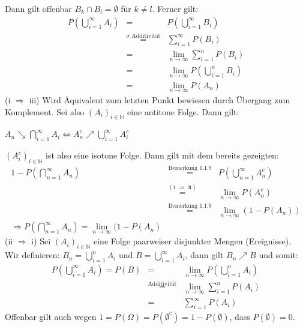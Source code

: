 \documentclass[10pt,a4paper]{report}
\numberwithin{equation}{section}
\numberwithin{figure}{section}
\theoremstyle{plain}
\theoremstyle{definition}
\theoremstyle{plain}
\theoremstyle{definition}
\theoremstyle{remark}
\theoremstyle{plain}
\begin{document}
Dann gilt offenbar $B_k\cap B_l=\emptyset$ für $k\neq l$. Ferner gilt:
\begin{eqnarray*}
P\left(\bigcup\limits_{i=1}^\infty A_i\right)&=&P\left(\bigcup\limits_{i=1}^\infty B_i\right)\\
&\overset{\sigma \text{ Additivität}}{=}&\sum\limits_{i=1}^\infty P(B_i)\\
&=& \lim\limits_{n \to \infty}\sum\limits_{i=1}^n P(B_i)\\ 
&=& \lim\limits_{n \to \infty} P\left(\bigcup\limits_{i=1}^n B_i\right)\\
&=& \lim\limits_{n \to \infty} P(A_n)
\end{eqnarray*}
(i $\Rightarrow$ iii) Wird Äquivalent zum letzten Punkt bewiesen durch Übergang zum Komplement. Sei also $(A_i)_{i \in \mathbb{N}}$ eine antitone Folge. Dann gilt:\begin{center}
$A_n \searrow \bigcap\limits_{i=1}^\infty A_i \Leftrightarrow A_n^c \nearrow \bigcup\limits_{i=1}^\infty A_i^c$
\end{center}
$(A_i^c)_{i \in \mathbb{N}}$ ist also eine isotone Folge. Dann gilt mit dem bereits gezeigten:
\begin{eqnarray*}
1-P\left(\bigcap\limits_{n=1}^\infty A_n\right)&\overset{\text{Bemerkung 1.1.9}}{=}&P\left(\bigcup\limits_{n=1}^\infty A_n^c\right)\\
&\overset{(\text{i } \Rightarrow \text{ ii})}{=}&\lim\limits_{n \to \infty}P(A_n^c)\\
&\overset{\text{Bemerkung 1.1.9}}{=}&\lim\limits_{n \to \infty}(1-P(A_n))\\
\Rightarrow P\left(\bigcap\limits_{n=1}^\infty A_n\right)=\lim\limits_{n \to \infty}(1-P(A_n)
\end{eqnarray*} 
(ii $\Rightarrow$ i) Sei $(A_i)_{i\in \mathbb{N}}$ eine Folge paarweiser disjunkter Mengen (Ereignisse). Wir definieren: $B_n=\bigcup\limits_{i=1}^n A_i$ und $B=\bigcup\limits_{i=1}^\infty A_i$, dann gilt $B_n \nearrow B$ und somit:
\begin{eqnarray*}
P\left(\bigcup\limits_{i=1}^\infty A_i\right)=P(B)&=&\lim\limits_{n \to \infty}P\left(\bigcup\limits_{i=1}^n A_i\right)\\
&\overset{\text{Additivität}}{=}& \lim\limits_{n \to \infty}\sum\limits_{i=1}^n P(A_i)\\
&=& \sum\limits_{i=1}^\infty P(A_i)
\end{eqnarray*} 
Offenbar gilt auch wegen $1=P(\Omega)=P(\emptyset^c)=1-P(\emptyset)$, dass $P(\emptyset)=0$.\\\\
\end{document}

